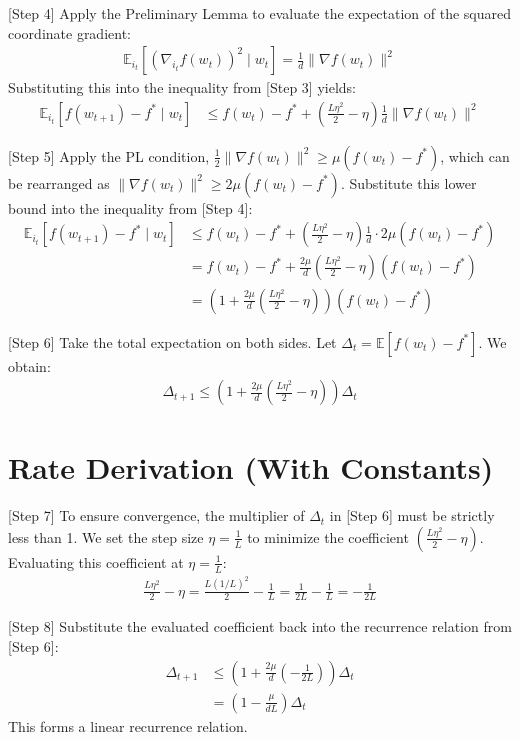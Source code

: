 \documentclass{article}
\begin{document}
[Step 4] Apply the Preliminary Lemma to evaluate the expectation of the squared coordinate gradient:
\begin{align*}
\mathbb{E}_{i_t} \left[ (\nabla_{i_t} f(w_t))^2 \mid w_t \right] = \frac{1}{d} \|\nabla f(w_t)\|^2
\end{align*}
Substituting this into the inequality from [Step 3] yields:
\begin{align*}
\mathbb{E}_{i_t} [f(w_{t+1}) - f^* \mid w_t] &\leq f(w_t) - f^* + \left( \frac{L \eta^2}{2} - \eta \right) \frac{1}{d} \|\nabla f(w_t)\|^2
\end{align*}

[Step 5] Apply the PL condition, $\frac{1}{2} \|\nabla f(w_t)\|^2 \geq \mu (f(w_t) - f^*)$, which can be rearranged as $\|\nabla f(w_t)\|^2 \geq 2\mu (f(w_t) - f^*)$. Substitute this lower bound into the inequality from [Step 4]:
\begin{align*}
\mathbb{E}_{i_t} [f(w_{t+1}) - f^* \mid w_t] &\leq f(w_t) - f^* + \left( \frac{L \eta^2}{2} - \eta \right) \frac{1}{d} \cdot 2\mu (f(w_t) - f^*) \\
&= f(w_t) - f^* + \frac{2\mu}{d} \left( \frac{L \eta^2}{2} - \eta \right) (f(w_t) - f^*) \\
&= \left( 1 + \frac{2\mu}{d} \left( \frac{L \eta^2}{2} - \eta \right) \right) (f(w_t) - f^*)
\end{align*}

[Step 6] Take the total expectation on both sides. Let $\Delta_t = \mathbb{E}[f(w_t) - f^*]$. We obtain:
\begin{align*}
\Delta_{t+1} \leq \left( 1 + \frac{2\mu}{d} \left( \frac{L \eta^2}{2} - \eta \right) \right) \Delta_t
\end{align*}

\section*{Rate Derivation (With Constants)}
[Step 7] To ensure convergence, the multiplier of $\Delta_t$ in [Step 6] must be strictly less than 1. We set the step size $\eta = \frac{1}{L}$ to minimize the coefficient $\left( \frac{L \eta^2}{2} - \eta \right)$. Evaluating this coefficient at $\eta = \frac{1}{L}$:
\begin{align*}
\frac{L \eta^2}{2} - \eta = \frac{L (1/L)^2}{2} - \frac{1}{L} = \frac{1}{2L} - \frac{1}{L} = -\frac{1}{2L}
\end{align*}

[Step 8] Substitute the evaluated coefficient back into the recurrence relation from [Step 6]:
\begin{align*}
\Delta_{t+1} &\leq \left( 1 + \frac{2\mu}{d} \left( -\frac{1}{2L} \right) \right) \Delta_t \\
&= \left( 1 - \frac{\mu}{dL} \right) \Delta_t
\end{align*}
This forms a linear recurrence relation.
\end{document}
